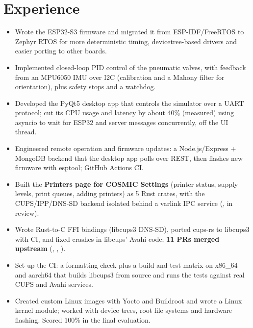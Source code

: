 \documentclass[10pt]{article}
\begin{document}
\section*{Experience}
\begin{itemize}
  \item Wrote the ESP32-S3 firmware and migrated it from ESP-IDF/FreeRTOS to Zephyr RTOS for more deterministic timing, devicetree-based drivers and easier porting to other boards.
  \item Implemented closed-loop PID control of the pneumatic valves, with feedback from an MPU6050 IMU over I2C (calibration and a Mahony filter for orientation), plus safety stops and a watchdog.
  \item Developed the PyQt5 desktop app that controls the simulator over a UART protocol; cut its CPU usage and latency by about 40\% (measured) using asyncio to wait for ESP32 and server messages concurrently, off the UI thread.
  \item Engineered remote operation and firmware updates: a Node.js/Express + MongoDB backend that the desktop app polls over REST, then flashes new firmware with esptool; GitHub Actions CI.
\end{itemize}
\begin{itemize}
  \item Built the \textbf{Printers page for COSMIC Settings} (printer status, supply levels, print queues, adding printers) as 5 Rust crates, with the CUPS/IPP/DNS-SD backend isolated behind a varlink IPC service (, in review).
  \item Wrote Rust-to-C FFI bindings (libcups3 DNS-SD), ported cups-rs to libcups3 with CI, and fixed crashes in libcups' Avahi code; \textbf{11 PRs merged upstream} (, , ).
  \item Set up the CI: a formatting check plus a build-and-test matrix on x86\_64 and aarch64 that builds libcups3 from source and runs the tests against real CUPS and Avahi services.
\end{itemize}
\begin{itemize}
  \item Created custom Linux images with Yocto and Buildroot and wrote a Linux kernel module; worked with device trees, root file systems and hardware flashing. Scored 100\% in the final evaluation.
\end{itemize}
\end{document}
